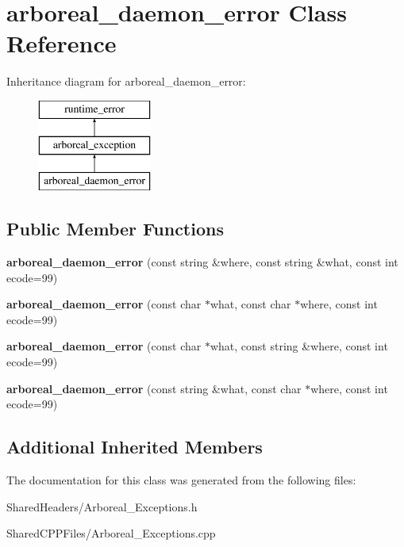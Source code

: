 \hypertarget{classarboreal__daemon__error}{}\section{arboreal\+\_\+daemon\+\_\+error Class Reference}
\label{classarboreal__daemon__error}
Inheritance diagram for arboreal\+\_\+daemon\+\_\+error\+:\begin{figure}[H]
\begin{center}
\leavevmode
\includegraphics[height=3.000000cm]{db/d0e/classarboreal__daemon__error}
\end{center}
\end{figure}
\subsection*{Public Member Functions}
\begin{DoxyCompactItemize}
\item 
\mbox{\label{classarboreal__daemon__error_aaa483ea710b1c20f37a61b7be7cd64fd}} 
{\bfseries arboreal\+\_\+daemon\+\_\+error} (const string \&where, const string \&what, const int ecode=99)
\item 
\mbox{\label{classarboreal__daemon__error_a4a8b88442bf94bf88ffa162c8e8f76ef}} 
{\bfseries arboreal\+\_\+daemon\+\_\+error} (const char $\ast$what, const char $\ast$where, const int ecode=99)
\item 
\mbox{\label{classarboreal__daemon__error_a32d6c4b31f97c709952f44e15fd6bf8a}} 
{\bfseries arboreal\+\_\+daemon\+\_\+error} (const char $\ast$what, const string \&where, const int ecode=99)
\item 
\mbox{\label{classarboreal__daemon__error_adc8e08526e65a9707c55b674c8d02044}} 
{\bfseries arboreal\+\_\+daemon\+\_\+error} (const string \&what, const char $\ast$where, const int ecode=99)
\end{DoxyCompactItemize}
\subsection*{Additional Inherited Members}


The documentation for this class was generated from the following files\+:\begin{DoxyCompactItemize}
\item 
Shared\+Headers/Arboreal\+\_\+\+Exceptions.\+h\item 
Shared\+C\+P\+P\+Files/Arboreal\+\_\+\+Exceptions.\+cpp\end{DoxyCompactItemize}
